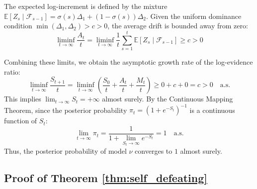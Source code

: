 \documentclass[12pt]{article}
\begin{document}
The expected log-increment is defined by the mixture $\mathbb{E}[Z_s \mid \mathcal{F}_{s-1}] = \sigma(s)\Delta_1 + (1-\sigma(s))\Delta_2$. Given the uniform dominance condition $\min(\Delta_1, \Delta_2) > c > 0$, the average drift is bounded away from zero:
\[
\liminf_{t \to \infty} \frac{A_t}{t} = \liminf_{t \to \infty} \frac{1}{t} \sum_{s=1}^t \mathbb{E}[Z_s \mid \mathcal{F}_{s-1}] \geq c > 0
\]

Combining these limits, we obtain the asymptotic growth rate of the log-evidence ratio:
\[
\liminf_{t \to \infty} \frac{S_{t+1}}{t} = \liminf_{t \to \infty} \left( \frac{S_0}{t} + \frac{A_t}{t} + \frac{M_t}{t} \right) \geq 0 + c + 0 = c > 0 \quad \text{a.s.}
\]
This implies $\lim_{t \to \infty} S_t = +\infty$ almost surely. By the Continuous Mapping Theorem, since the posterior probability $\pi_t = (1 + e^{-S_t})^{-1}$ is a continuous function of $S_t$:
\[
\lim_{t \to \infty} \pi_t = \frac{1}{1 + \lim_{S_t \to \infty} e^{-S_t}} = 1 \quad \text{a.s.}
\]
Thus, the posterior probability of model $\nu$ converges to $1$ almost surely.


    


\subsection{Proof of Theorem \ref{thm:self_defeating}}
\label{app:D:self_defeating_proof}
\end{document}
